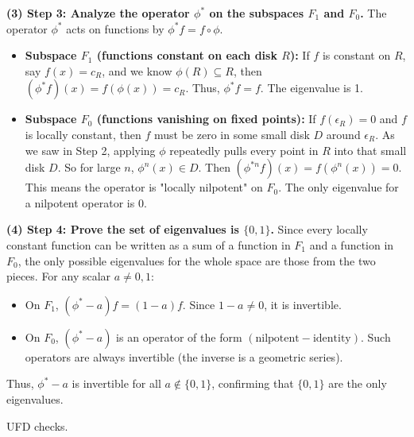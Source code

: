 \begin{solution}
\textbf{(3) Step 3: Analyze the operator $\phi^*$ on the subspaces $F_1$ and $F_0$.}
The operator $\phi^*$ acts on functions by $\phi^* f = f \circ \phi$.
\begin{itemize}
    \item \textbf{Subspace $F_1$ (functions constant on each disk $R$):} If $f$ is constant on $R$, say $f(x) = c_R$, and we know $\phi(R) \subseteq R$, then $(\phi^* f)(x) = f(\phi(x)) = c_R$. Thus, $\phi^* f = f$. The eigenvalue is 1.
    \item \textbf{Subspace $F_0$ (functions vanishing on fixed points):} If $f(\epsilon_R) = 0$ and $f$ is locally constant, then $f$ must be zero in some small disk $D$ around $\epsilon_R$.
    As we saw in Step 2, applying $\phi$ repeatedly pulls every point in $R$ into that small disk $D$.
    So for large $n$, $\phi^n(x) \in D$. Then $(\phi^{*n} f)(x) = f(\phi^n(x)) = 0$.
    This means the operator is "locally nilpotent" on $F_0$. The only eigenvalue for a nilpotent operator is 0.
\end{itemize}

\textbf{(4) Step 4: Prove the set of eigenvalues is $\{0, 1\}$.}
Since every locally constant function can be written as a sum of a function in $F_1$ and a function in $F_0$, the only possible eigenvalues for the whole space are those from the two pieces.
For any scalar $a \neq 0, 1$:
\begin{itemize}
    \item On $F_1$, $(\phi^* - a) f = (1-a)f$. Since $1-a \neq 0$, it is invertible.
    \item On $F_0$, $(\phi^* - a)$ is an operator of the form $(\text{nilpotent} - \text{identity})$. Such operators are always invertible (the inverse is a geometric series).
\end{itemize}
Thus, $\phi^* - a$ is invertible for all $a \notin \{0, 1\}$, confirming that $\{0, 1\}$ are the only eigenvalues.
\end{solution}

\begin{exercise}
\label{algebra:2015:5}
UFD checks.
\end{exercise}

